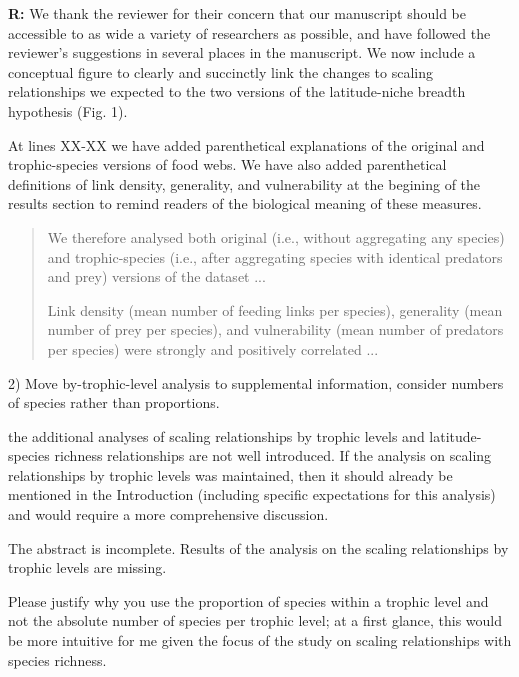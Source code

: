 \documentclass[12pt]{letter}
\newenvironment{refquote}{\bigskip \begin{it}}{\end{it}\smallskip}
\begin{document}
  \textbf{R:} We thank the reviewer for their concern that our manuscript
  should be accessible to as wide a variety of researchers as possible, and
  have followed the reviewer's suggestions in several places in the manuscript.
  We now include a conceptual figure to clearly and succinctly link the changes
  to scaling relationships we expected to the two versions of the latitude-niche
  breadth hypothesis (Fig. 1).


  At lines XX-XX we have added parenthetical explanations of the original and 
  trophic-species versions of food webs. We have also added parenthetical definitions
  of link density, generality, and vulnerability at the begining of the results section
  to remind readers of the biological meaning of these measures.

  \begin{quotation}

    We therefore analysed both original (i.e., without aggregating any species) and
    trophic-species (i.e., after aggregating species with identical predators and
    prey) versions of the dataset ...

    \smallskip

      Link density (mean number of feeding links per species), generality
      (mean number of prey per species), and vulnerability (mean number of predators
      per species) were strongly and positively correlated ...

  \end{quotation}


  2) Move by-trophic-level analysis to supplemental information, consider
  numbers of species rather than proportions.

  \begin{refquote}

    the additional analyses of scaling relationships by trophic levels and
    latitude-species richness relationships are not well introduced. If the
    analysis on scaling relationships by trophic levels was maintained, then
    it should already be mentioned in the Introduction (including specific
    expectations for this analysis) and would require a more comprehensive
    discussion.

    \smallskip

    The abstract is incomplete. Results of the analysis on the scaling
    relationships by trophic levels are missing.

    \smallskip

    Please justify why you use the proportion of species within a trophic
    level and not the absolute number of species per trophic level; at a first
    glance, this would be more intuitive for me given the focus of the study
    on scaling relationships with species richness.

  \end{refquote}
\end{document}

